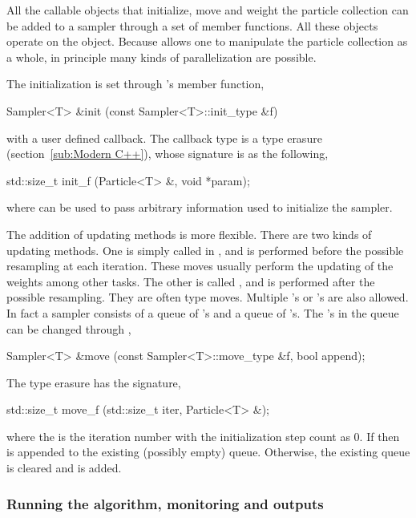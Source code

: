 All the callable objects that initialize, move and weight the particle
collection can be added to a sampler through a set of member functions. All
these objects operate on the  object. Because \vsmc
allows one to manipulate the particle collection as a whole, in principle many
kinds of parallelization are possible.

The initialization is set through 's 
member function,
\begin{cppcode}
Sampler<T> &init (const Sampler<T>::init_type &f)
\end{cppcode}
with a user defined callback. The callback type  is a
type erasure (section~\ref{sub:Modern C++}), whose signature is as the
following,
\begin{cppcode}
std::size_t init_f (Particle<T> &, void *param);
\end{cppcode}
where  can be used to pass arbitrary information used to
initialize the sampler.

The addition of updating methods is more flexible. There are two kinds of
updating methods. One is simply called  in \vsmc, and is
performed before the possible resampling at each iteration. These moves
usually perform the updating of the weights among other tasks. The other is
called , and is performed after the possible resampling. They
are often \mcmc type moves. Multiple 's or 's
are also allowed. In fact a \vsmc sampler consists of a queue of
's and a queue of 's. The 's
in the queue can be changed through ,
\begin{cppcode}
Sampler<T> &move (const Sampler<T>::move_type &f, bool append);
\end{cppcode}
The type erasure  has the signature,
\begin{cppcode}
std::size_t move_f (std::size_t iter, Particle<T> &);
\end{cppcode}
where the  is the iteration number with the initialization
step count as $0$. If  then  is
appended to the existing (possibly empty) queue. Otherwise, the existing queue
is cleared and  is added.

\subsubsection{Running the algorithm, monitoring and outputs}
\label{ssub:Running the algorithm, monitoring and outputs}

